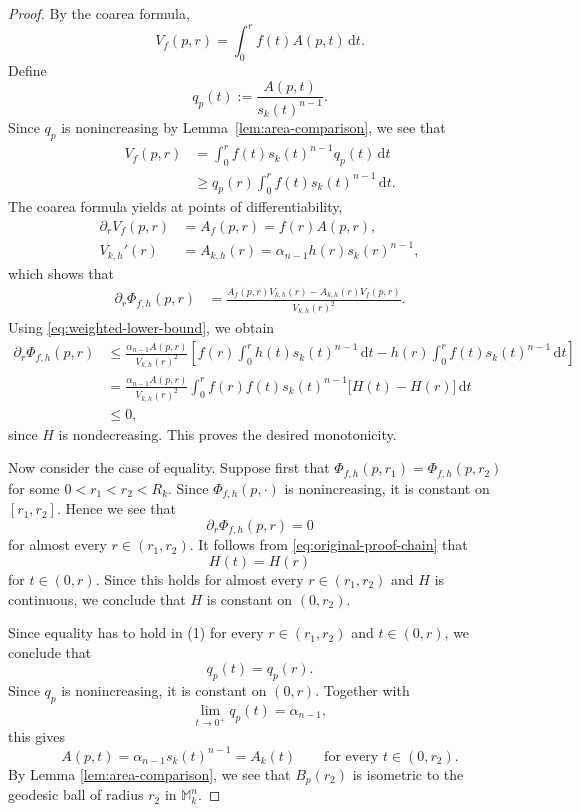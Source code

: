 \documentclass[10pt,a4paper]{amsart}
\newcommand{\dd}{\,\mathrm{d}}
\begin{document}
\begin{proof}
By the coarea formula,
\[
V_f(p,r)
=
\int_0^r f(t)A(p,t)\dd t.
\]
Define
\[
q_p(t):=\frac{A(p,t)}{s_k(t)^{n-1}}.
\]
Since $q_p$ is nonincreasing by Lemma~\ref{lem:area-comparison}, we see that
\begin{align}
V_f(p,r)
&=
\int_0^r f(t)s_k(t)^{n-1}q_p(t)\dd t
\nonumber\\
&\geq
q_p(r)
\int_0^r f(t)s_k(t)^{n-1}\dd t.
\label{eq:weighted-lower-bound}
\end{align}
The coarea formula yields at points of differentiability,
\begin{align*}
\partial_r V_f(p,r)&=A_f(p,r)=f(r)A(p,r), \\
V_{k,h}'(r)&=A_{k,h}(r) =\alpha_{n-1}h(r)s_k(r)^{n-1},
\end{align*}
which shows that
\begin{align*}
\partial_r\Phi_{f,h}(p,r)
&=
\frac{
 A_f(p,r)V_{k,h}(r)
 -A_{k,h}(r)V_f(p,r)
}{
 V_{k,h}(r)^2
}.
\end{align*}
Using \eqref{eq:weighted-lower-bound}, we obtain
\begin{align}
\partial_r\Phi_{f,h}(p,r)
&\leq
\frac{\alpha_{n-1}A(p,r)}{V_{k,h}(r)^2}
\left[
 f(r)\int_0^r h(t)s_k(t)^{n-1}\dd t
 -
 h(r)\int_0^r f(t)s_k(t)^{n-1}\dd t
\right]
\nonumber\\
&=
\frac{\alpha_{n-1}A(p,r)}{V_{k,h}(r)^2}
\int_0^r
 f(r)f(t)s_k(t)^{n-1}
 \bigl[H(t)-H(r)\bigr]\dd t
\nonumber\\
&\leq0,
\label{eq:original-proof-chain}
\end{align}
since $H$ is nondecreasing. This proves the desired monotonicity.

Now consider the case of equality. Suppose first that $\Phi_{f,h}(p,r_1)=\Phi_{f,h}(p,r_2)$ for some \(0<r_1<r_2<R_k\). Since \(\Phi_{f,h}(p,\cdot)\) is nonincreasing, it is constant on \([r_1,r_2]\). Hence we see that 
$$\partial_r\Phi_{f,h}(p,r)=0$$
for almost every \(r\in(r_1,r_2)\). It follows from \eqref{eq:original-proof-chain} that
$$H(t)=H(r)$$
for \(t\in(0,r)\). Since this holds for almost every $r\in(r_1,r_2)$ and $H$ is continuous, we conclude that $H$ is constant on $(0,r_2)$.

Since equality has to hold in (1) for every $r \in (r_1, r_2)$ and $t \in (0,r)$, we conclude that
$$
q_p(t)=q_p(r).
$$
Since $q_p$ is nonincreasing, it is constant on \((0,r)\). Together with
\[
\lim_{t\to0^+}q_p(t)=\alpha_{n-1},
\]
this gives
\begin{equation*}
A(p,t)
=
\alpha_{n-1}s_k(t)^{n-1}
=
A_k(t)
\qquad\text{for every }t\in(0,r_2).
\end{equation*}
By Lemma \ref{lem:area-comparison}, we see that $B_p(r_2)$ is isometric to the geodesic ball of radius $r_2$ in $\mathbb{M}_k^n$.










\end{proof}
\end{document}
